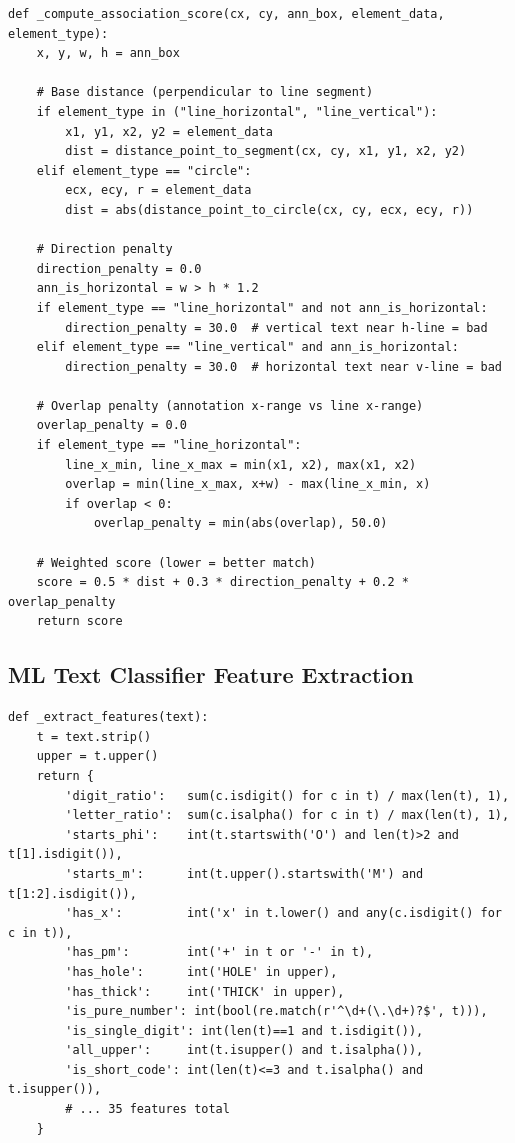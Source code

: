 \documentclass[12pt,a4paper]{article}
\begin{document}
\begin{lstlisting}[caption={Direction-aware weighted scoring for geometric association}]
def _compute_association_score(cx, cy, ann_box, element_data, element_type):
    x, y, w, h = ann_box
    
    # Base distance (perpendicular to line segment)
    if element_type in ("line_horizontal", "line_vertical"):
        x1, y1, x2, y2 = element_data
        dist = distance_point_to_segment(cx, cy, x1, y1, x2, y2)
    elif element_type == "circle":
        ecx, ecy, r = element_data
        dist = abs(distance_point_to_circle(cx, cy, ecx, ecy, r))
    
    # Direction penalty
    direction_penalty = 0.0
    ann_is_horizontal = w > h * 1.2
    if element_type == "line_horizontal" and not ann_is_horizontal:
        direction_penalty = 30.0  # vertical text near h-line = bad
    elif element_type == "line_vertical" and ann_is_horizontal:
        direction_penalty = 30.0  # horizontal text near v-line = bad
    
    # Overlap penalty (annotation x-range vs line x-range)
    overlap_penalty = 0.0
    if element_type == "line_horizontal":
        line_x_min, line_x_max = min(x1, x2), max(x1, x2)
        overlap = min(line_x_max, x+w) - max(line_x_min, x)
        if overlap < 0:
            overlap_penalty = min(abs(overlap), 50.0)
    
    # Weighted score (lower = better match)
    score = 0.5 * dist + 0.3 * direction_penalty + 0.2 * overlap_penalty
    return score
\end{lstlisting}

\subsection{ML Text Classifier Feature Extraction}

\begin{lstlisting}[caption={Engineered features for annotation classification}]
def _extract_features(text):
    t = text.strip()
    upper = t.upper()
    return {
        'digit_ratio':   sum(c.isdigit() for c in t) / max(len(t), 1),
        'letter_ratio':  sum(c.isalpha() for c in t) / max(len(t), 1),
        'starts_phi':    int(t.startswith('O') and len(t)>2 and t[1].isdigit()),
        'starts_m':      int(t.upper().startswith('M') and t[1:2].isdigit()),
        'has_x':         int('x' in t.lower() and any(c.isdigit() for c in t)),
        'has_pm':        int('+' in t or '-' in t),
        'has_hole':      int('HOLE' in upper),
        'has_thick':     int('THICK' in upper),
        'is_pure_number': int(bool(re.match(r'^\d+(\.\d+)?$', t))),
        'is_single_digit': int(len(t)==1 and t.isdigit()),
        'all_upper':     int(t.isupper() and t.isalpha()),
        'is_short_code': int(len(t)<=3 and t.isalpha() and t.isupper()),
        # ... 35 features total
    }
\end{lstlisting}
\end{document}
